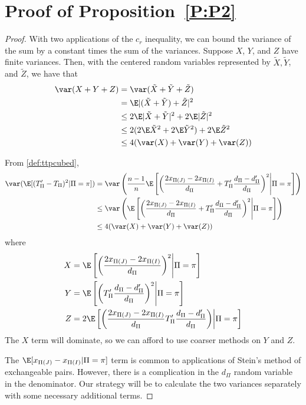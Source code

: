 \section{Proof of Proposition~\ref{P:P2}}
\begin{proof}
  With two applications of the $c_r$ inequality, we can bound the variance of the sum by a constant
times the sum of the variances.  Suppose $X$, $Y$, and $Z$ have finite variances.  Then, with the
centered random variables represented by $\tilde{X}, \tilde{Y}$, and $\tilde{Z}$, we have that
  \begin{align*}
    \var(X + Y + Z)
    &= \var(\tilde{X}+\tilde{Y}+\tilde{Z}) \\
    &= \E|(\tilde{X}+\tilde{Y})+\tilde{Z}|^2 \\
    &\leq 2 \E |\tilde{X}+\tilde{Y}|^2 + 2\E |\tilde{Z}|^2 \\
    &\leq 2(2\E \tilde{X}^2 + 2\E \tilde{Y}^2) + 2\E \tilde{Z}^2 \\
    &\leq 4(\var(X) + \var(Y) + \var(Z))
  \end{align*}

  From \eqref{def:ttpcubed},
  \begin{align*}
    \var (\E[(T_{\Pi}'-T_{\Pi})^2 | \Pi = \pi]) &= \var \left ( \frac{n-1}{n}\E \left [
      \left ( \frac{2x_{\Pi(J)}-2x_{\Pi(I)}}{d_{\Pi}}+T_{\Pi}'\frac{d_{\Pi}-d_{\Pi}'}{d_{\Pi}} \right )^2
        \middle | \Pi = \pi \right ] \right ) \\
    &\leq \var \left ( \E \left [
      \left ( \frac{2x_{\Pi(J)}-2x_{\Pi(I)}}{d_{\Pi}}+T_{\Pi}'\frac{d_{\Pi}-d_{\Pi}'}{d_{\Pi}} \right )^2
        \middle | \Pi = \pi \right ] \right ) \\
    &\leq 4(\var(X) + \var(Y) + \var(Z))
  \end{align*}
  where
  \begin{align*}
    X &= \E \left [ \left ( \frac{2x_{\Pi(J)}-2x_{\Pi(I)}}{d_{\Pi}} \right )^2
        \middle | \Pi = \pi \right ] \\
    Y &= \E \left [ \left
          ( T_{\Pi}'\frac{d_{\Pi}-d_{\Pi}'}{d_{\Pi}} \right )^2 \middle | \Pi = \pi \right ] \\
    Z &= 2 \E \left [ \left ( \frac{2x_{\Pi(J)}-2x_{\Pi(I)}}{d_{\Pi}}
         T_{\Pi}'\frac{d_{\Pi}-d_{\Pi}'}{d_{\Pi}} \right ) \middle | \Pi = \pi \right ]
  \end{align*}
  The $X$ term will dominate, so we can afford to use coarser methods on $Y$ and $Z$.

  The $\E[x_{\Pi(J)}-x_{\Pi(I)} | \Pi = \pi]$ term is common to applications of Stein's method of
  exchangeable pairs.  However, there is a complication in the $d_{\Pi}$ random variable in the
  denominator.  Our strategy will be to calculate the two variances separately with some necessary
  additional terms.


\end{proof}
